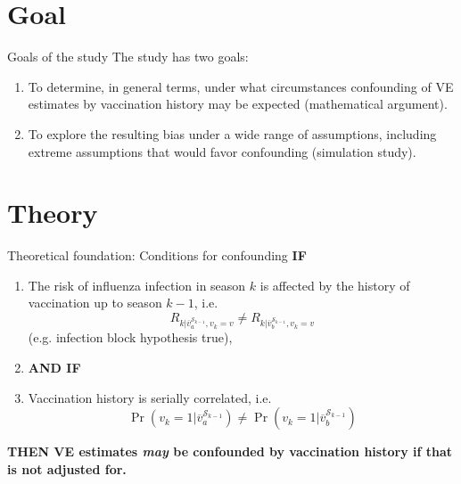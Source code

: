 \documentclass{beamer}
\begin{document}
%
\section{Goal}
\begin{frame}{Goals of the study}
	The study has two goals:
	\begin{enumerate}
		\item To determine, in general terms, under what circumstances confounding of VE estimates by vaccination history may be expected (mathematical argument).
		\item To explore the resulting bias under a wide range of assumptions, including extreme assumptions that would favor confounding (simulation study).
	\end{enumerate}
\end{frame}
%
\section{Theory}
\begin{frame}{Theoretical foundation: Conditions for confounding}
\textbf{IF}
	\begin{enumerate}
		\item The risk of influenza infection in season $k$ is affected by the history of  vaccination up to season $k-1$, i.e. 
		\begin{equation}
		\label{eq:conf_cond1}
		R_{k|\overline{v}^{\mathcal{S}_{k-1}}_a, v_k=v} \neq R_{k|\overline{v}^{\mathcal{S}_{k-1}}_b,v_k=v}
		\end{equation}
		(e.g. infection block hypothesis true), 
		\item[]\textbf{AND IF}
%
\item Vaccination history is serially correlated, i.e.
 \begin{equation}
		 \Pr(v_{k}=1|\overline{v}^{\mathcal{S}_{k-1}}_a) \neq \Pr(v_{k}=1|\overline{v}^{\mathcal{S}_{k-1}}_b)
 \end{equation}
	\end{enumerate}
\textbf{THEN VE estimates \emph{may} be confounded by vaccination history if that  is not adjusted for.}
\end{frame}
\end{document}
